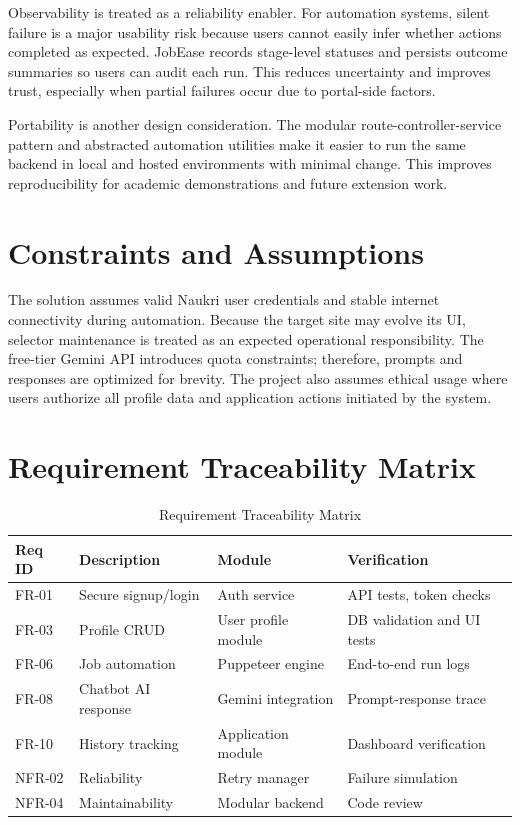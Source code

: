 \documentclass[12pt,a4paper,oneside]{report}
\begin{document}
Observability is treated as a reliability enabler. For automation systems, silent failure is a major usability risk because users cannot easily infer whether actions completed as expected. JobEase records stage-level statuses and persists outcome summaries so users can audit each run. This reduces uncertainty and improves trust, especially when partial failures occur due to portal-side factors.

Portability is another design consideration. The modular route-controller-service pattern and abstracted automation utilities make it easier to run the same backend in local and hosted environments with minimal change. This improves reproducibility for academic demonstrations and future extension work.

\section{Constraints and Assumptions}
The solution assumes valid Naukri user credentials and stable internet connectivity during automation. Because the target site may evolve its UI, selector maintenance is treated as an expected operational responsibility. The free-tier Gemini API introduces quota constraints; therefore, prompts and responses are optimized for brevity. The project also assumes ethical usage where users authorize all profile data and application actions initiated by the system.

\section{Requirement Traceability Matrix}
\begin{table}[H]
\centering
\caption{Requirement Traceability Matrix}
\begin{tabular}{p{}p{}p{}p{}}
\toprule
Req ID & Description & Module & Verification \\
\midrule
FR-01 & Secure signup/login & Auth service & API tests, token checks \\
FR-03 & Profile CRUD & User profile module & DB validation and UI tests \\
FR-06 & Job automation & Puppeteer engine & End-to-end run logs \\
FR-08 & Chatbot AI response & Gemini integration & Prompt-response trace \\
FR-10 & History tracking & Application module & Dashboard verification \\
NFR-02 & Reliability & Retry manager & Failure simulation \\
NFR-04 & Maintainability & Modular backend & Code review \\
\bottomrule
\end{tabular}
\end{table}
\end{document}
